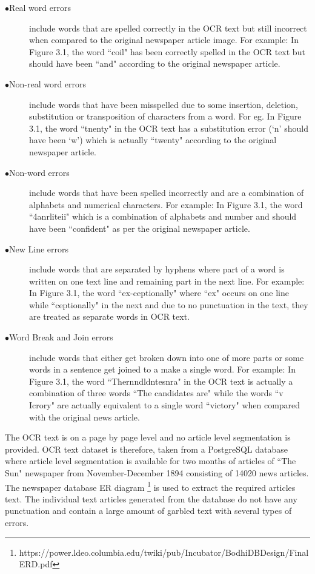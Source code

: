 \documentclass[letterpaper,11pt]{report}
\begin{document}
\begin{description}
 \item[$\bullet$Real word errors] include words that are spelled correctly in the OCR text but still incorrect when compared to the original newspaper article image. For example: In Figure 3.1, the word ``coil"  has been correctly spelled in the OCR text  but should have been ``and" according to the original newspaper article. 
 \item[$\bullet$Non-real word errors] include words that have been misspelled due to some insertion, deletion, substitution or transposition of characters from a word. For eg. In Figure 3.1, the word ``tnenty" in the OCR text has a substitution error (`n' should have been `w') which is actually ``twenty" according to the original newspaper article.
 \item[$\bullet$Non-word errors] include words that have been spelled incorrectly and are a combination of alphabets and numerical characters. For example: In Figure 3.1, the word ``4anrliteii" which is a combination of alphabets and number and should have been ``confident" as per the original newspaper article.
\item[$\bullet$New Line errors] include words that are separated by hyphens where part of a word is written on one text line and remaining part in the next line. For example: In Figure 3.1, the word ``ex-ceptionally" where ``ex" occurs on one line while ``ceptionally" in the next and due to no punctuation in the text, they are treated as separate words in OCR text.
\item[$\bullet$Word Break and Join errors] include words that either get broken down into one of more parts or some words in a sentence get joined to a make a single word. For example: In Figure 3.1, the word ``Thernndldntesnra" in the OCR text is actually a combination of three words ``The candidates are" while the words ``v Icrory" are actually equivalent to a single word ``victory" when compared with the original news article.
\end{description} 

The OCR text  is on a page by page level and no article level segmentation is provided. OCR text dataset is therefore, taken from a PostgreSQL database where article level segmentation is available for two months of articles of ``The Sun" newspaper from November-December 1894 consisting of 14020 news articles. The newspaper database ER diagram \footnote{https://power.ldeo.columbia.edu/twiki/pub/Incubator/BodhiDBDesign/Final ERD.pdf }
is used to extract the required articles text. The individual text articles generated from the database do not have any punctuation and contain a large amount of garbled text with several types of errors.
\end{document}
